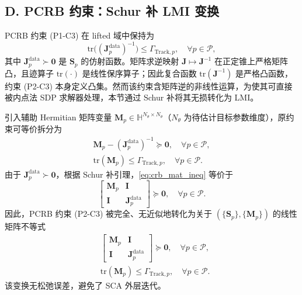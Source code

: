 \documentclass[12pt,a4paper]{article}
\newcommand{\mat}[1]{\mathbf{#1}}
\newcommand{\tr}{\text{tr}}
\begin{document}
\subsection*{D. PCRB 约束：Schur 补 LMI 变换}

PCRB 约束 (P1-C3) 在 lifted 域中保持为
\begin{equation}
\tr\big((\mat{J}_p^{\text{data}})^{-1}\big) \leq \Gamma_{\text{Track},p}, \quad \forall p \in \mathcal{P}, \tag{P2-C3}
\end{equation}
其中 $\mat{J}_p^{\text{data}} \succ \mat{0}$ 是 $\mat{S}_p$ 的仿射函数。矩阵求逆映射 $\mat{J} \mapsto \mat{J}^{-1}$ 在正定锥上严格矩阵凸，且迹算子 $\tr(\cdot)$ 是线性保序算子；因此复合函数 $\tr(\mat{J}^{-1})$ 是严格凸函数，约束 (P2-C3) 本身定义凸集。然而该约束含矩阵逆的非线性运算，为使其可直接被内点法 SDP 求解器处理，本节通过 Schur 补将其无损转化为 LMI。

引入辅助 Hermitian 矩阵变量 $\mat{M}_p \in \mathbb{H}^{N_\theta \times N_\theta}$（$N_\theta$ 为待估计目标参数维度），原约束可等价拆分为
\begin{subequations}\label{eq:crb_decouple}
\begin{align}
\mat{M}_p - (\mat{J}_p^{\text{data}})^{-1} \succeq \mat{0}, \quad \forall p \in \mathcal{P}, \label{eq:crb_mat_ineq} \\
\tr(\mat{M}_p) \leq \Gamma_{\text{Track},p}, \quad \forall p \in \mathcal{P}. \label{eq:crb_trace_ineq}
\end{align}
\end{subequations}
由于 $\mat{J}_p^{\text{data}} \succ \mat{0}$，根据 Schur 补引理，\eqref{eq:crb_mat_ineq} 等价于
\begin{equation}\label{eq:crb_lmi}
\begin{bmatrix} \mat{M}_p & \mat{I} \\ \mat{I} & \mat{J}_p^{\text{data}} \end{bmatrix} \succeq \mat{0}, \quad \forall p \in \mathcal{P}.
\end{equation}
因此，PCRB 约束 (P2-C3) 被完全、无近似地转化为关于 $(\{\mat{S}_p\}, \{\mat{M}_p\})$ 的线性矩阵不等式
\begin{subequations}\label{eq:crb_lmi_final}
\begin{align}
& \begin{bmatrix} \mat{M}_p & \mat{I} \\ \mat{I} & \mat{J}_p^{\text{data}} \end{bmatrix} \succeq \mat{0}, \quad \forall p \in \mathcal{P}, \label{eq:crb_lmi_final_a} \\
& \tr(\mat{M}_p) \leq \Gamma_{\text{Track},p}, \quad \forall p \in \mathcal{P}. \label{eq:crb_lmi_final_b}
\end{align}
\end{subequations}
该变换无松弛误差，避免了 SCA 外层迭代。
\end{document}
